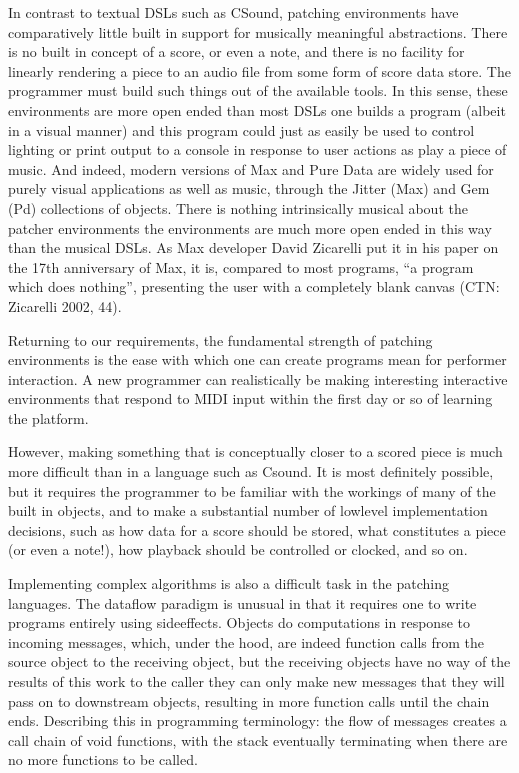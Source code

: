 \documentclass[letterpaper,10pt,english]{sphinxmanual}
\begin{document}
\sphinxAtStartPar
In contrast to textual DSLs such as CSound, patching environments have comparatively
little built in support for musically meaningful abstractions.
There is no built in concept of a score, or even a note, and there is no
facility for linearly rendering a piece to an audio file from some form of score data store.
The programmer must build such things out of the available tools.
In this sense, these environments are more open ended than most DSLs \sphinxhyphen{} one
builds a program (albeit in a visual manner) and this program
could just as easily be used to control lighting or print output to a console
in response to user actions as play a piece of music. And indeed, modern versions of Max
and Pure Data are widely used for purely visual applications as well as music,
through the Jitter (Max) and Gem (Pd) collections of objects.
There is nothing intrinsically musical about the patcher environments \sphinxhyphen{}
the environments are much more open ended in this way than the musical DSLs.
As Max developer David Zicarelli put it in his paper on the 17th anniversary of Max,
it is, compared to most programs, “a program which does nothing”, presenting the user
with a completely blank canvas (CTN: Zicarelli 2002, 44).

\sphinxAtStartPar
Returning to our requirements, the fundamental strength of patching environments
is the ease with which one can create programs mean for performer interaction.
A new programmer can realistically be making interesting interactive environments
that respond to MIDI input within the first day or so of learning the platform.

\sphinxAtStartPar
However, making something that is conceptually closer to a scored piece is much more
difficult than in a language such as Csound.
It is most definitely possible, but it requires the programmer to be
familiar with the workings of many of the built in objects, and to make
a substantial number of low\sphinxhyphen{}level implementation decisions, such as
how data for a score should be stored, what constitutes a piece (or even a note!),
how playback should be controlled or clocked, and so on.

\sphinxAtStartPar
Implementing complex algorithms is also a difficult task in the patching languages.
The dataflow paradigm is unusual in that it requires one to write programs entirely
using side\sphinxhyphen{}effects. Objects do computations in response to incoming messages, which, under
the hood, are indeed function calls from the source object to the receiving object,
but the receiving objects have no way of  the results of this work to the caller \sphinxhyphen{} they
can only make new messages that they will pass on to downstream objects, resulting in more
function calls until the chain ends.
Describing this in programming terminology: the flow of messages creates a call chain
of void functions, with the stack eventually terminating when there are no more functions
to be called.
\end{document}
